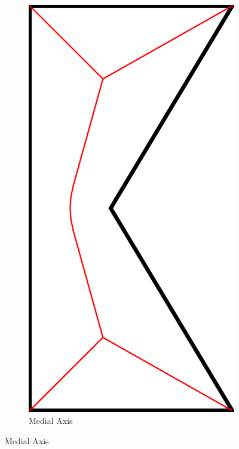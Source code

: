 \begin{figure}\centering
\setlength{\figwidth}{0.19\columnwidth}
\setlength{\figwidthTwo}{0.3\columnwidth}
\begin{subfigure}{\figwidth}\centering
\includegraphics[height=\figwidthTwo]{sources/method/simple_skeleton_mat}
\caption{Medial Axis}\label{shape_decomposition_mat}

\end{subfigure}
\end{figure}
